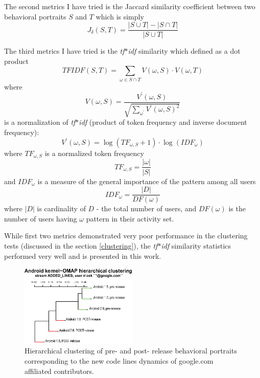 \documentclass[conference]{IEEEtran}
\begin{document}
The second metrics I have tried is the Jaccard similarity coefficient between two behavioral portraits
$S$ and $T$ which is simply 
\begin{equation}
J_{\delta}(S,T) = \frac{|S\cup T| - |S\cap T|}{|S\cup T|}
\end{equation} 

The third metrics I have tried is the \textit{tf$\ast$idf} similarity which defined as a dot product 
\begin{equation}
 TFIDF(S,T) = \sum_{\omega \in S \cap T} V(\omega, S) \cdot V(\omega, T)
\end{equation} 
where 
\begin{equation}
 V(\omega, S) = \frac { V^{\prime} (\omega,S) } { \sqrt{ \sum_{\omega^{\prime}} V^{\prime} (\omega,S)^{2}} }
\end{equation} 
is a normalization of \textit{tf$\ast$idf} (product of token frequency and inverse document frequency):
\begin{equation}
 V^{\prime} (\omega,S) = \log(TF_{\omega, S} +1) \cdot \log(IDF_{\omega})
\end{equation} 
where $TF_{\omega, S}$ is a normalized token frequency
\begin{equation}
 TF_{\omega, S} = \frac{|\omega|}{|S|}
\end{equation} 
and $IDF_{\omega}$ is a measure of the general importance of the pattern among all users
\begin{equation}
 IDF_{\omega} = \frac{|D|}{DF(\omega)}
\end{equation} 
where $|D|$ is cardinality of $D$ - the total number of users, and $DF(\omega)$ is the number of users 
having $\omega$ pattern in their activity set. 

While first two metrics demonstrated very poor performance in the clustering tests (discussed in the section \ref{clustering}), 
the \textit{tf$\ast$idf} similarity statistics performed very well and is presented in this work.

\begin{figure}[t]
  \centering
  \includegraphics[width=0.5\textwidth]{figures/omap-hclust.eps}
  \caption{Hierarchical clustering of pre- and post- release behavioral portraits corresponding to the new code lines dynamics of google.com affiliated contributors.}
  \label{fig:kernel_cluster}
\end{figure}
\end{document}
